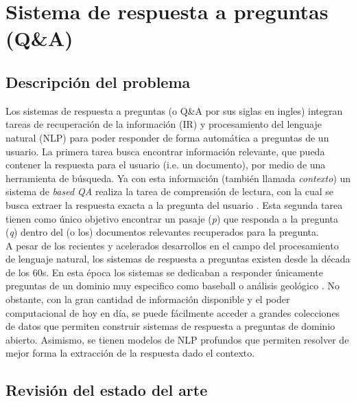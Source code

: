 \section{Sistema de respuesta a preguntas (Q\&A)}

\subsection{Descripción del problema}

Los sistemas de respuesta a preguntas (o Q\&A por sus siglas en ingles) integran tareas de recuperación de la información (IR) y procesamiento del lenguaje natural (NLP) para poder responder de forma automática a preguntas de un usuario. La primera tarea busca encontrar información relevante, que pueda contener la respuesta para el usuario (i.e. un documento), por medio de una herramienta de búsqueda. Ya con esta información (también llamada \textit{contexto}) un sistema de \textit{based QA} realiza la tarea de comprensión de lectura, con la cual se busca extraer la respuesta exacta a la pregunta del usuario \cite{}.
Esta segunda tarea tienen como único objetivo encontrar un pasaje (\textit{p}) que responda a la pregunta (\textit{q}) dentro del (o los) documentos relevantes recuperados para la pregunta. \\

A pesar de los recientes y acelerados desarrollos en el campo del procesamiento de lenguaje natural, los sistemas de respuesta a preguntas existen desde la década de los 60s. En esta época los sistemas se dedicaban a responder únicamente preguntas de un dominio muy especifico como baseball \cite{} o análisis geológico \cite{}. No obstante, con la gran cantidad de información disponible y el poder computacional de hoy en día, se puede fácilmente acceder a grandes colecciones de datos que permiten construir sistemas de respuesta a preguntas de dominio abierto. Asimismo, se tienen modelos de NLP profundos que permiten resolver de mejor forma la extracción de la respuesta dado el contexto.

\subsection{Revisión del estado del arte}

